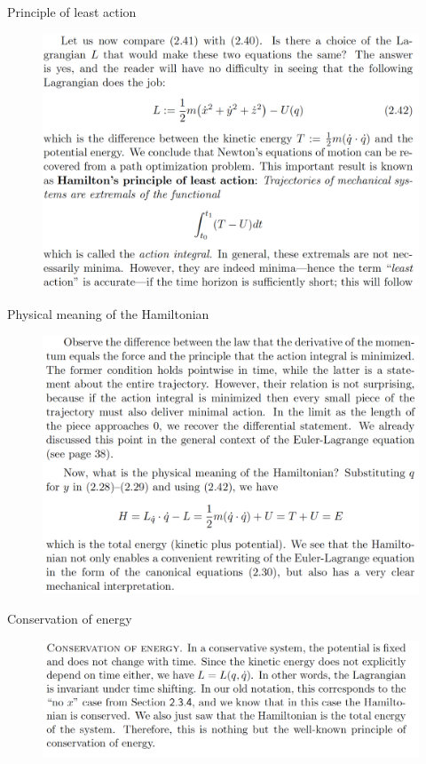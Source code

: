 \documentclass{beamer}
\begin{document}
\begin{frame}{Principle of least action}
    \begin{figure}
        \centering
        \includegraphics[width=0.9\linewidth]{ch2/fig22.png}
    \end{figure}
\end{frame}


\begin{frame}{Physical meaning of the Hamiltonian}
    \begin{figure}
        \centering
        \includegraphics[width=0.9\linewidth]{ch2/fig23.png}
    \end{figure}
\end{frame}

\begin{frame}{Conservation of energy}
    \begin{figure}
        \centering
        \includegraphics[width=\linewidth]{ch2/fig24.png}
    \end{figure}
\end{frame}
\end{document}
